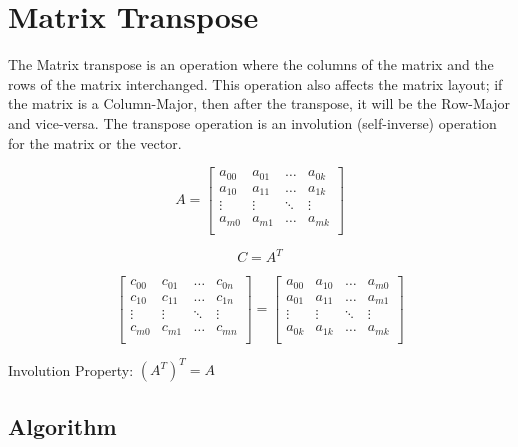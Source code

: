 
\chapter{Matrix Transpose}

The Matrix transpose is an operation where the columns of the matrix 
and the rows of the matrix interchanged. This operation also affects 
the matrix layout; if the matrix is a Column-Major, then after the 
transpose, it will be the Row-Major and vice-versa. The transpose 
operation is an involution (self-inverse) operation for the matrix or the vector.


\[
A= 
\begin{bmatrix}
    a_{00}  & a_{01}    & \dots     & a_{0k}\\
    a_{10}  & a_{11}    & \dots     & a_{1k}\\
    \vdots  & \vdots    & \ddots    & \vdots\\
    a_{m0}  & a_{m1}    & \dots     & a_{mk}\\
\end{bmatrix}
\]

\vspace*{0.5cm}


\[
C = A^T
\]

\[
\begin{bmatrix}
    c_{00}  & c_{01}    & \dots     & c_{0n}\\
    c_{10}  & c_{11}    & \dots     & c_{1n}\\
    \vdots  & \vdots    & \ddots    & \vdots\\
    c_{m0}  & c_{m1}    & \dots     & c_{mn}\\
\end{bmatrix}
= 
\begin{bmatrix}
    a_{00}  & a_{10}    & \dots     & a_{m0}\\
    a_{01}  & a_{11}    & \dots     & a_{m1}\\
    \vdots  & \vdots    & \ddots    & \vdots\\
    a_{0k}  & a_{1k}    & \dots     & a_{mk}\\
\end{bmatrix}
\]

\vspace*{0.5cm}

Involution Property: $(A^T)^T = A$

\clearpage

\section{Algorithm}

